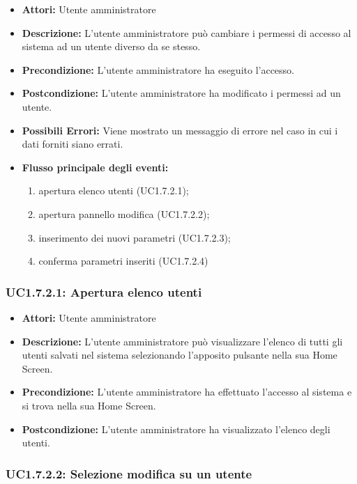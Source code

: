 \begin{itemize}
    \item \textbf{Attori:} Utente amministratore
    \item \textbf{Descrizione:} L'utente amministratore può cambiare i permessi di accesso al sistema ad un utente diverso da se stesso.
    \item \textbf{Precondizione:} L'utente amministratore ha eseguito l'accesso.
    \item \textbf{Postcondizione:} L'utente amministratore ha modificato i permessi ad un utente.
    \item \textbf{Possibili Errori:}
    Viene mostrato un messaggio di errore nel caso in cui i dati forniti siano errati.
    \item \textbf{Flusso principale degli eventi:}

    \begin{enumerate}
        \item apertura elenco utenti (UC1.7.2.1);
        \item apertura pannello modifica (UC1.7.2.2);
        \item inserimento dei nuovi parametri (UC1.7.2.3);
        \item conferma parametri inseriti (UC1.7.2.4)
    \end{enumerate}

\end{itemize}

\subsubsection{UC1.7.2.1: Apertura elenco utenti}

\begin{itemize}
    \item \textbf{Attori:} Utente amministratore
    \item \textbf{Descrizione:} L'utente amministratore può visualizzare l'elenco di tutti gli utenti salvati nel sistema selezionando l'apposito pulsante nella sua Home Screen.
    \item \textbf{Precondizione:} L'utente amministratore ha effettuato l'accesso al sistema e si trova nella sua Home Screen.
    \item \textbf{Postcondizione:} L'utente amministratore ha visualizzato l'elenco degli utenti.
\end{itemize}

\subsubsection{UC1.7.2.2: Selezione modifica su un utente}

